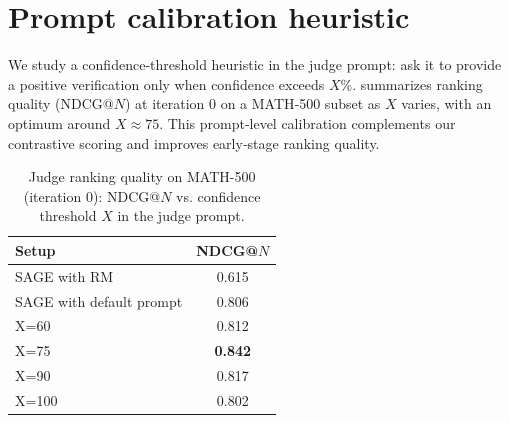 \documentclass{article}
\theoremstyle{plain}
\theoremstyle{definition}
\theoremstyle{remark}
\begin{document}
\section {Prompt calibration heuristic}
\noindent We study a confidence‑threshold heuristic in the judge prompt: ask it to provide a positive verification only when confidence exceeds \(X\)\%.  summarizes ranking quality (NDCG@\(N\)) at iteration 0 on a MATH‑500 subset as \(X\) varies, with an optimum around \(X\!\approx\!75\). This prompt‑level calibration complements our contrastive scoring and improves early‑stage ranking quality.
\begin{table}[t]
\caption{Judge ranking quality on MATH-500 (iteration 0): NDCG@\(N\) vs. confidence threshold \(X\) in the judge prompt.}
\label{tab:judge-threshold-ndcg}
\vskip 0.1in
\centering
\begin{small}
\begin{sc}
\begin{tabular}{lc}
\toprule
Setup & NDCG@\(N\) \\
\midrule
SAGE with RM & 0.615 \\
SAGE with default prompt & 0.806 \\
X=60 & 0.812 \\
X=75 & \textbf{0.842} \\
X=90 & 0.817 \\
X=100 & 0.802 \\
\bottomrule
\end{tabular}
\end{sc}
\end{small}
\vskip -0.25in
\end{table}
\end{document}
